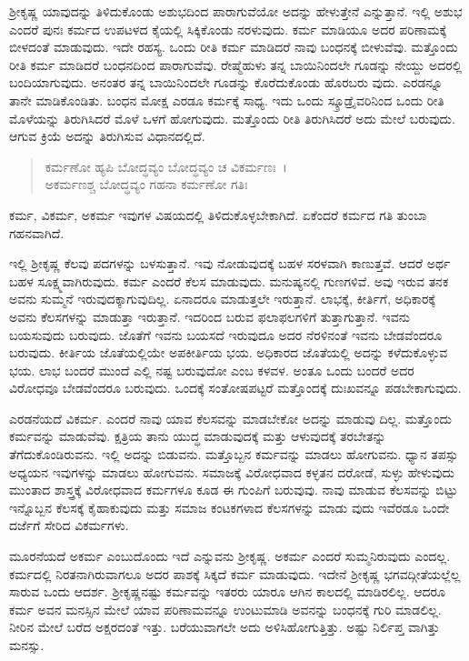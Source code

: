 ಶ‍್ರೀಕೃಷ್ಣ ಯಾವುದನ್ನು ತಿಳಿದುಕೊಂಡು ಅಶುಭದಿಂದ ಪಾರಾಗುವೆಯೋ ಅದನ್ನು ಹೇಳುತ್ತೇನೆ ಎನ್ನುತ್ತಾನೆ. ಇಲ್ಲಿ ಅಶುಭ ಎಂದರೆ ಪುನಃ ಕರ್ಮದ ಉಪಟಳದ ಕೈಯಲ್ಲಿ ಸಿಕ್ಕಿಕೊಂಡು ನರಳುವುದು. ಕರ್ಮ ಮಾಡಿಯೂ ಅದರ ಪರಿಣಾಮಕ್ಕೆ ಬೀಳದಂತೆ ಮಾಡುವುದು. ಇದೇ ರಹಸ್ಯ. ಒಂದು ರೀತಿ ಕರ್ಮ ಮಾಡಿದರೆ ನಾವು ಬಂಧನಕ್ಕೆ ಬೀಳುವೆವು. ಮತ್ತೊಂದು ರೀತಿ ಕರ್ಮ ಮಾಡಿದರೆ ಬಂಧನದಿಂದ ಪಾರಾಗುವೆವು. ರೇಷ್ಮೆಹುಳು ತನ್ನ ಬಾಯಿನಿಂದಲೇ ಗೂಡನ್ನು ನೇಯ್ದು ಅದರಲ್ಲಿ ಬಂದಿಯಾಗುವುದು. ಅನಂತರ ತನ್ನ ಬಾಯಿನಿಂದಲೇ ಗೂಡನ್ನು ಕೊರೆದುಕೊಂಡು ಹೊರಬರು ವುದು. ಎರಡನ್ನೂ ತಾನೇ ಮಾಡಿಕೊಂಡಿತು. ಬಂಧನ ಮೋಕ್ಷ ಎರಡೂ ಕರ್ಮಕ್ಕೆ ಸಾಧ್ಯ. ಇದು ಒಂದು ಸ್ಕ್ರೂಡ್ರೈವರಿನಿಂದ ಒಂದು ರೀತಿ ಮೊಳೆಯನ್ನು ತಿರುಗಿಸಿದರೆ ಮೊಳೆ ಒಳಗೆ ಹೋಗುವುದು. ಮತ್ತೊಂದು ರೀತಿ ತಿರುಗಿಸಿದರೆ ಅದು ಮೇಲೆ ಬರುವುದು. ಆಗುವ ಕ್ರಿಯೆ ಅದನ್ನು ತಿರುಗಿಸುವ ವಿಧಾನದಲ್ಲಿದೆ.

\begin{verse}
ಕರ್ಮಣೋ ಹ್ಯಪಿ ಬೋದ್ಧವ್ಯಂ ಬೋದ್ಧವ್ಯಂ ಚ ವಿಕರ್ಮಣಃ~।\\ಅಕರ್ಮಣಶ್ಚ ಬೋದ್ಧವ್ಯಂ ಗಹನಾ ಕರ್ಮಣೋ ಗತಿಃ 
\end{verse}

{\small ಕರ್ಮ, ವಿಕರ್ಮ, ಅಕರ್ಮ ಇವುಗಳ ವಿಷಯದಲ್ಲಿ ತಿಳಿದುಕೊಳ್ಳಬೇಕಾಗಿದೆ. ಏಕೆಂದರೆ ಕರ್ಮದ ಗತಿ ತುಂಬಾ ಗಹನವಾಗಿದೆ.}

ಇಲ್ಲಿ ಶ‍್ರೀಕೃಷ್ಣ ಕೆಲವು ಪದಗಳನ್ನು ಬಳಸುತ್ತಾನೆ. ಇವು ನೋಡುವುದಕ್ಕೆ ಬಹಳ ಸರಳವಾಗಿ ಕಾಣುತ್ತವೆ. ಆದರೆ ಅರ್ಥ ಬಹಳ ಸೂಕ್ಷ್ಮವಾಗಿರುವುದು. ಕರ್ಮ ಎಂದರೆ ಕೆಲಸ ಮಾಡುವುದು. ಮನುಷ್ಯನಲ್ಲಿ ಗುಣಗಳಿವೆ. ಅವು ಇರುವ ತನಕ ಅವನು ಸುಮ್ಮನೆ ಇರುವುದಕ್ಕಾಗುವುದಿಲ್ಲ. ಏನಾದರೂ ಮಾಡುತ್ತಲೇ ಇರುತ್ತಾನೆ. ಲಾಭಕ್ಕೆ, ಕೀರ್ತಿಗೆ, ಅಧಿಕಾರಕ್ಕೆ ಅವನು ಕೆಲಸಗಳನ್ನು ಮಾಡುತ್ತಾ ಇರುತ್ತಾನೆ. ಇದರಿಂದ ಬರುವ ಫಲಾಫಲಗಳಿಗೆ ತುತ್ತಾಗುತ್ತಾನೆ. ಇವನು ಬಯಸುವುದು ಬರುವುದು. ಜೊತೆಗೆ ಇವನು ಬಯಸದೆ ಇರುವುದೂ ಅದರ ನೆರಳಿನಂತೆ ಇವನು ಬೇಡವೆಂದರೂ ಬರುವುದು. ಕೀರ್ತಿಯ ಜೊತೆಯಲ್ಲಿಯೇ ಅಪಕೀರ್ತಿಯ ಭಯ. ಅಧಿಕಾರದ ಜೊತೆಯಲ್ಲಿ ಅದನ್ನು ಕಳೆದುಕೊಳ್ಳುವ ಭಯ. ಲಾಭ ಬಂದರೆ ಮುಂದೆ ಎಲ್ಲಿ ನಷ್ಟ ಬರುವುದೋ ಎಂಬ ಕಳವಳ. ಅಂತೂ ಒಂದು ಬಂದರೆ ಅದರ ವಿರೋಧವೂ ಬೇಡವೆಂದರೂ ಬರುವುದು. ಒಂದಕ್ಕೆ ಸಂತೋಷಪಟ್ಟರೆ ಮತ್ತೊಂದಕ್ಕೆ ದುಃಖವನ್ನೂ ಪಡಬೇಕಾಗುವುದು.

ಎರಡನೆಯದೆ ವಿಕರ್ಮ. ಎಂದರೆ ನಾವು ಯಾವ ಕೆಲಸವನ್ನು ಮಾಡಬೇಕೋ ಅದನ್ನು ಮಾಡುವು ದಿಲ್ಲ. ಮತ್ತೊಂದು ಕರ್ಮವನ್ನು ಮಾಡುವೆವು. ಕ್ಷತ್ರಿಯ ತಾನು ಯುದ್ಧ ಮಾಡುವುದಕ್ಕೆ ಮತ್ತು ಆಳುವುದಕ್ಕೆ ತರಬೇತನ್ನು ತೆಗೆದುಕೊಂಡಿರುವನು. ಇಲ್ಲಿ ಅದನ್ನು ಬಿಡುವನು. ಮತ್ತೊಬ್ಬನ ಕರ್ಮವನ್ನು ಮಾಡಲು ಹೋಗುವನು. ಧ್ಯಾನ ತಪಸ್ಸು ಅಧ್ಯಯನ ಇವುಗಳನ್ನು ಮಾಡಲು ಹೋಗುವನು. ಸಮಾಜಕ್ಕೆ ವಿರೋಧವಾದ ಕಳ್ಳತನ ದರೋಡೆ, ಸುಳ್ಳು ಹೇಳುವುದು ಮುಂತಾದ ಶಾಸ್ತ್ರಕ್ಕೆ ವಿರೋಧವಾದ ಕರ್ಮಗಳೂ ಕೂಡ ಈ ಗುಂಪಿಗೆ ಬರುವುವು. ನಾವು ಮಾಡುವ ಕೆಲಸವನ್ನು ಬಿಟ್ಟು ಇನ್ನೊಬ್ಬನ ಕೆಲಸಕ್ಕೆ ಕೈಹಾಕುವುದು ಮತ್ತು ಸಮಾಜ ಕಂಟಕಗಳಾದ ಕೆಲಸಗಳನ್ನು ಮಾಡು ವುದು ಇವೆರಡೂ ಒಂದೇ ದರ್ಜೆಗೆ ಸೇರಿದ ವಿಕರ್ಮಗಳು.

ಮೂರನೆಯದೆ ಅಕರ್ಮ ಎಂಬುದೊಂದು ಇದೆ ಎನ್ನುವನು ಶ‍್ರೀಕೃಷ್ಣ. ಅಕರ್ಮ ಎಂದರೆ ಸುಮ್ಮನಿರುವುದು ಎಂದಲ್ಲ. ಕರ್ಮದಲ್ಲಿ ನಿರತನಾಗಿರುವಾಗಲೂ ಅದರ ಪಾಶಕ್ಕೆ ಸಿಕ್ಕದೆ ಕರ್ಮ ಮಾಡುವುದು. ಇದೇನೆ ಶ‍್ರೀಕೃಷ್ಣ ಭಗವದ್ಗೀತೆಯಲ್ಲೆಲ್ಲ ಸಾರುವ ಒಂದು ಆದರ್ಶ. ಶ‍್ರೀಕೃಷ್ಣನಷ್ಟು ಕರ್ಮವನ್ನು ಇತರರು ಯಾರೂ ಆಗಿನ ಕಾಲದಲ್ಲಿ ಮಾಡಿರಲಿಲ್ಲ. ಆದರೂ ಕರ್ಮ ಅವನ ಮನಸ್ಸಿನ ಮೇಲೆ ಯಾವ ಪರಿಣಾಮವನ್ನೂ ಉಂಟುಮಾಡಿ ಅವನನ್ನು ಬಂಧನಕ್ಕೆ ಗುರಿ ಮಾಡಲಿಲ್ಲ. ನೀರಿನ ಮೇಲೆ ಬರೆದ ಅಕ್ಷರದಂತೆ ಇತ್ತು. ಬರೆಯುವಾಗಲೇ ಅದು ಅಳಿಸಿಹೋಗುತ್ತಿತ್ತು. ಅಷ್ಟು ನಿರ್ಲಿಪ್ತ ವಾಗಿತ್ತು ಮನಸ್ಸು.


